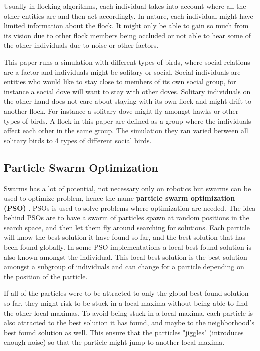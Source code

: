 Usually in flocking algorithms, each individual takes into account where all the other entities are and then act accordingly. In nature, each individual might have limited information about the flock. It might only be able to gain so much from its vision due to other flock members being occluded or not able to hear some of the other individuals due to noise or other factors.

This paper runs a simulation with different types of birds, where social relations are a factor and individuals might be solitary or social. Social individuals are entities who would like to stay close to members of its own social group, for instance a social dove will want to stay with other doves. Solitary individuals on the other hand does not care about staying with its own flock and might drift to another flock. For instance a solitary dove might fly amongst hawks or other types of birds. A flock in this paper are defined as a group where the individuals affect each other in the same group. The simulation they ran varied between all solitary birds to 4 types of different social birds.

\subsection{Particle Swarm Optimization}
Swarms has a lot of potential, not necessary only on robotics but swarms can be used to optimize problem, hence the name \textbf{particle swarm optimization (PSO)} \citep{Eberhart}. PSOs is used to solve problems where optimization are needed. The idea behind PSOs are to have a swarm of particles spawn at random positions in the search space, and then let them fly around searching for solutions. Each particle will know the best solution it have found so far, and the best solution that has been found globally. In some PSO implementations a local best found solution is also known amongst the individual. This local best solution is the best solution amongst a subgroup of individuals and can change for a particle depending on the position of the particle. 

If all of the particles were to be attracted to only the global best found solution so far, they might risk to be stuck in a local maxima without being able to find the other local maximas. To avoid being stuck in a local maxima, each particle is also attracted to the best solution it has found, and maybe to the neighborhood's best found solution as well. This ensure that the particles "jiggles" (introduces enough noise) so that the particle might jump to another local maxima. 

